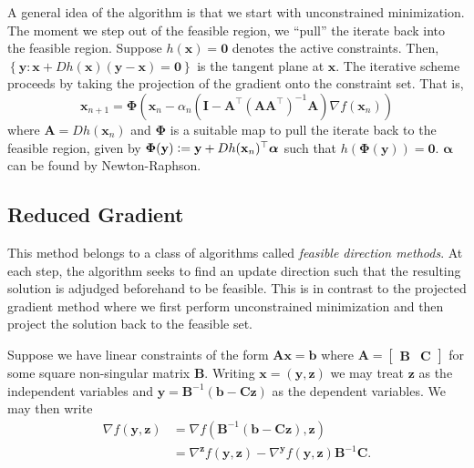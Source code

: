 A general idea of the algorithm is that we start with unconstrained minimization. The moment we step out of the feasible region, we ``pull'' the iterate back into the feasible region. Suppose $h(\mathbf{x}) = \mathbf{0}$ denotes the active constraints. Then, $\left\{ \mathbf{y} \colon \mathbf{x} + Dh(\mathbf{x}) (\mathbf{y} - \mathbf{x}) = \mathbf{0} \right\}$ is the tangent plane at $\mathbf{x}$. The iterative scheme proceeds by taking the projection of the gradient onto the constraint set. That is,
\[
   \mathbf{x}_{n+1} = \bm{\Phi} \left( \mathbf{x}_n - \alpha_n \left( \mathbf{I} - \mathbf{A}^{\top} (\mathbf{AA}^{\top})^{-1} \mathbf{A} \right) \nabla f(\mathbf{x}_n) \right) 
\]
where $\mathbf{A} = Dh(\mathbf{x}_n)$ and $\bm{\Phi}$ is a suitable map to pull the iterate back to the feasible region, given by $\bm{\Phi}(\mathbf{y}) \vcentcolon= \mathbf{y} + Dh(\mathbf{x}_n)^{\top} \bm{\alpha}$ such that $h(\bm{\Phi}(\mathbf{y})) = \mathbf{0}$. $\bm{\alpha}$ can be found by Newton-Raphson. 

\subsection*{Reduced Gradient}

This method belongs to a class of algorithms called \textit{feasible direction methods}. At each step, the algorithm seeks to find an update direction such that the resulting solution is adjudged beforehand to be feasible. This is in contrast to the projected gradient method where we first perform unconstrained minimization and then project the solution back to the feasible set. 

Suppose we have linear constraints of the form $\mathbf{Ax} = \mathbf{b}$ where $\mathbf{A} = \begin{bmatrix} \mathbf{B} & \mathbf{C} \end{bmatrix}$ for some square non-singular matrix $\mathbf{B}$. Writing $\mathbf{x} = (\mathbf{y}, \mathbf{z})$ we may treat $\mathbf{z}$ as the independent variables and $\mathbf{y} = \mathbf{B}^{-1}(\mathbf{b} - \mathbf{Cz})$ as the dependent variables. We may then write
\begin{align*}
    \nabla f(\mathbf{y}, \mathbf{z}) &= \nabla f\left( \mathbf{B}^{-1}(\mathbf{b} - \mathbf{Cz}), \mathbf{z} \right) \\
    &= \nabla^{\mathbf{z}} f(\mathbf{y}, \mathbf{z}) - \nabla^{\mathbf{y}} f(\mathbf{y}, \mathbf{z}) \mathbf{B}^{-1}\mathbf{C}. 
\end{align*}


